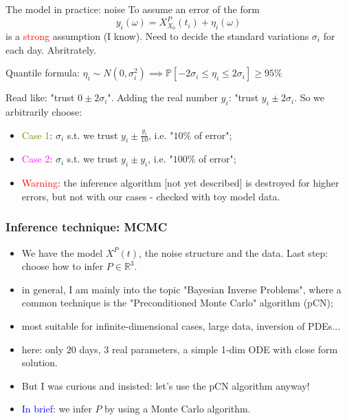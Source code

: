 \documentclass{beamer}
\begin{document}
\begin{frame}{The model in practice: noise}
	To assume an error of the form
	\begin{equation}
		y_i(\omega) = X^P_{X_0} (t_i) + \eta_i(\omega)
	\end{equation}
	is a \textcolor{red}{strong} assumption (I know). Need to decide 
	the standard variations $\sigma_i$ for each day. Abritrately.


	Quantile formula:
	$\eta_i \sim N(0, \sigma_i^2) \implies
\mathbb{P}[ - 2 \sigma_i \leq \eta_i \leq 2 \sigma_i] \geq 95\%$


	Read like: "trust $0 \pm 2 \sigma_i$". Adding the real
	number $y_i$: "trust $y_i \pm 2 \sigma_i$. So 
	we arbitrarily choose:
	\begin{itemize}
		\item <2-> \textcolor{olive}{Case 1}: 
			$\sigma_i$ s.t. we trust
		$y_i \pm \frac{y_i}{10}$, i.e. "$10\%$ of error";
	\item <3-> \textcolor{magenta}{Case 2}: $\sigma_i$ s.t. we trust
		$y_i \pm y_i$, i.e. "$100\%$ of error";
	\item <4-> \textcolor{red}{Warning}:
		the inference algorithm [not yet described]
		is destroyed for higher errors, but not with our cases
			- checked with toy model data.
	\end{itemize}
\end{frame}


\begin{frame}
	\frametitle{Inference technique: MCMC}
	\begin{itemize}
		\item<1->
	We have the model $X^P(t)$, the noise structure and the data.
	Last step: choose how to infer $P \in \mathbb{R}^3$.


	\item<2-> in general, I am mainly into the topic
		"Bayesian Inverse Problems", where a 
		common technique is the "Preconditioned Monte Carlo" algorithm
			(pCN);

	\item<3-> most suitable for infinite-dimensional cases,
		large data, inversion of PDEs...

	\item<4-> here: only $20$ days, $3$ real parameters, a simple
		1-dim ODE with close form solution. 

	\item<5-> But I was curious and insisted: let's use the 
		pCN algorithm anyway!

	\item<6-> \textcolor{blue}{In brief}: we infer $P$ by using
		a Monte Carlo algorithm.

	\end{itemize}
\end{frame}
\end{document}
